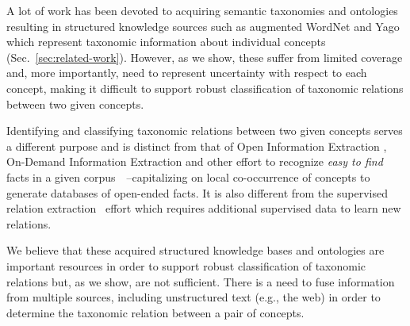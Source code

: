 A lot of work has been devoted to acquiring semantic taxonomies and
ontologies \cite{Snow2006,suchanek2007WWW} resulting in structured
knowledge sources such as augmented WordNet and Yago which represent
taxonomic information about individual concepts
(Sec.~\ref{sec:related-work}). However, as we show, these suffer from
limited coverage and, more importantly, need to represent uncertainty
with respect to each concept, making it difficult to support robust
classification of taxonomic relations between two given concepts.


Identifying and classifying taxonomic relations between two given concepts serves a different purpose and is distinct from that of Open Information Extraction \cite{BCSBE07}, On-Demand Information Extraction \cite{Sekine06} and other effort to recognize {\em easy to find} facts in a given
corpus~~\cite{davidov-rappoport:2008:ACLMain2,pacsca-vandurme:2008:ACLMain}--capitalizing on local co-occurrence of concepts to generate databases of open-ended facts.
%
It is also different from the supervised relation
extraction~\cite{RothYi04} effort which requires additional supervised
data to learn new relations.
%
%

We believe that these acquired structured knowledge bases and ontologies are important resources in order to support robust classification of taxonomic relations but, as we show, are not sufficient. There is a need to fuse information from multiple sources, including unstructured text (e.g., the web) in order to determine the taxonomic relation between a pair of concepts.

